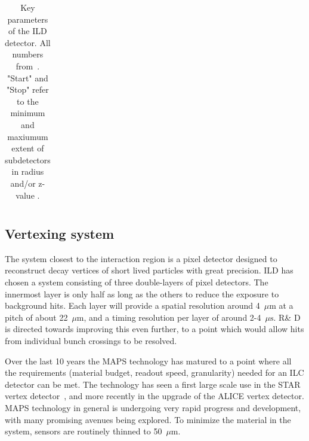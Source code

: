 \documentclass[%
 amsmath,amssymb,
 aps,
 longbibliography,
]{revtex4-1}
\newcommand{\bottomrule}{\hline}
\begin{document}
\begin{table}[th]
\begin{tabular}{|l|l|c|c|p{4cm}|}
        
\bottomrule
    \end{tabular}
    \caption{Key parameters of the ILD detector. All numbers from~\cite{Behnke:2013lya}. "Start" and "Stop" refer to the minimum and maxiumum extent of subdetectors in radius and/or z-value .}
    \label{ild:tab:barrelpara}
\end{table}


\subsection{Vertexing system}
The system closest to the interaction region is a pixel detector designed to reconstruct decay vertices of short lived particles with great precision. ILD has chosen a system consisting of three double-layers of pixel detectors. The innermost layer is only half as long as the others to reduce the exposure to background hits. Each layer will provide a spatial resolution around 4~$\mu\mathrm{m}$ at a pitch of about 22~$\mu\mathrm{m}$, and a timing resolution per layer of around 2-4~$\mu\mathrm{s}$. R\& D is directed towards improving this even further, to a point which would allow hits from individual bunch crossings to be resolved.

Over the last 10 years the MAPS technology has matured to a point where all the requirements (material budget, readout speed, granularity) needed for an ILC detector can be met. The technology has seen a first large scale use in the STAR vertex detector~\cite{ild:bib:VTXcps3}, and more recently in the upgrade of the ALICE vertex detector. 
MAPS technology in general is undergoing very rapid progress and development, with many promising avenues being explored. To minimize the material in the system, sensors are routinely thinned to 50~$\mu{\mathrm m}$. 
\end{document}
